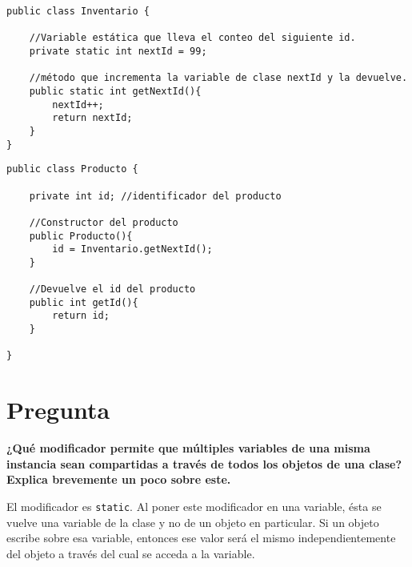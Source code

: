 \documentclass{article}
\begin{document}
\begin{verbatim}
public class Inventario {

    //Variable estática que lleva el conteo del siguiente id.
    private static int nextId = 99;

    //método que incrementa la variable de clase nextId y la devuelve.
    public static int getNextId(){
        nextId++;
        return nextId;
    }
}
\end{verbatim}

\begin{verbatim}
public class Producto {
    
    private int id; //identificador del producto

    //Constructor del producto
    public Producto(){
        id = Inventario.getNextId();
    }

    //Devuelve el id del producto
    public int getId(){
        return id;
    }

}
\end{verbatim}

\section*{Pregunta}

\textbf{¿Qué modificador permite que múltiples variables de una misma instancia sean compartidas a través de todos los objetos de una clase? Explica brevemente un poco sobre este.}

El modificador es \texttt{static}. Al poner este modificador en una variable, ésta se vuelve una variable de la clase y no de un objeto en particular. Si un objeto escribe sobre esa variable, entonces ese valor será el mismo independientemente del objeto a través del cual se acceda a la variable.
\end{document}
